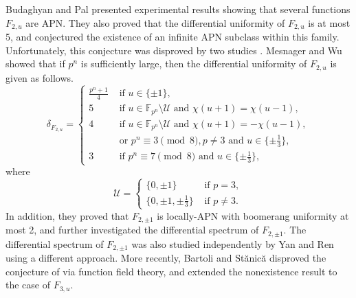 \documentclass[11pt]{article}
\numberwithin{theorem}{section}
\newcommand{\Fpn}{\mathbb{F}_{p^n}}
\begin{document}
Budaghyan and Pal \cite{BP25} presented experimental results showing that several functions $F_{2,u}$ are APN. They also proved that the differential uniformity of $F_{2,u}$ is at most 5, and conjectured the existence of an infinite APN subclass within this family. Unfortunately, this conjecture was disproved by two studies \cite{MW25,BS25}. Mesnager and Wu \cite{MW25} showed that if $p^n$ is sufficiently large, then the differential uniformity of $F_{2,u}$ is given as follows.
\begin{equation*}
	\delta_{F_{2,u}} =
	\begin{cases}
		\frac{p^n+1}{4} &\text{ if }u\in \{\pm1\},\\
		5 &\text{ if }u\in \Fpn\setminus \mathcal{U}\text{ and }\chi(u+1)=\chi(u-1),\\
		4 &\text{ if }u\in \Fpn\setminus \mathcal{U}\text{ and }\chi(u+1)=-\chi(u-1),\\
		 &\text{ or }p^n\equiv 3\pmod{8}, p
		\ne 3\text{ and }u\in \{\pm \frac{1}{3}\},\\
		3 &\text{ if }p^n\equiv 7\pmod{8} \text{ and }u\in \{\pm \frac{1}{3}\},
	\end{cases}
\end{equation*}
where
\begin{equation*}
	\mathcal{U} = 
	\begin{cases}
		\{0, \pm 1\} &\text{ if }p=3,\\
		\{0, \pm 1, \pm \frac{1}{3}\} &\text{ if }p\ne3.
	\end{cases}
\end{equation*}
In addition, they proved that $F_{2,\pm1}$ is locally-APN with boomerang uniformity at most 2, and further investigated the differential spectrum of $F_{2,\pm1}$. The differential spectrum of $F_{2,\pm1}$ was also studied independently by Yan and Ren \cite{YR25} using a different approach. More recently, Bartoli and Stănică \cite{BS25} disproved the conjecture of \cite{BP25} via function field theory, and extended the nonexistence result to the case of $F_{3,u}$.
\end{document}
